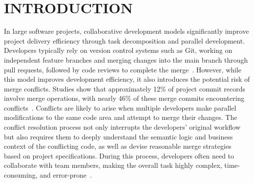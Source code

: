 \documentclass[sigconf,review,anonymous]{acmart}
\begin{document}




\maketitle

\section{INTRODUCTION}
In large software projects, collaborative development models significantly improve project delivery efficiency through task decomposition and parallel development. Developers typically rely on version control systems such as Git, working on independent feature branches and merging changes into the main branch through pull requests, followed by code reviews to complete the merge~\cite{1}. However, while this model improves development efficiency, it also introduces the potential risk of merge conflicts. Studies show that approximately 12\% of project commit records involve merge operations, with nearly 46\% of these merge commits encountering conflicts~\cite{2}. Conflicts are likely to arise when multiple developers make parallel modifications to the same code area and attempt to merge their changes. The conflict resolution process not only interrupts the developers' original workflow but also requires them to deeply understand the semantic logic and business context of the conflicting code, as well as devise reasonable merge strategies based on project specifications. During this process, developers often need to collaborate with team members, making the overall task highly complex, time-consuming, and error-prone~\cite{3}.
\end{document}
